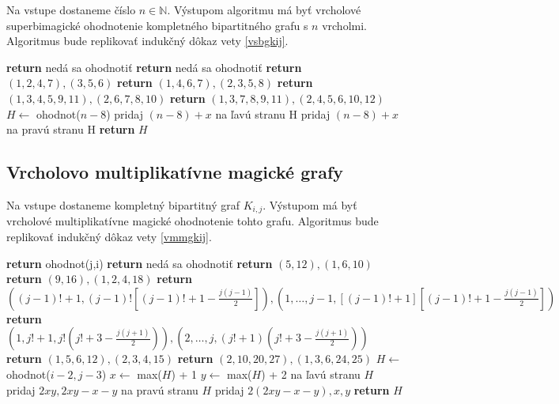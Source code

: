 \begin{alg}
\label{algvsbgkij}
Na vstupe dostaneme číslo $n \in \mathbb{N}$. Výstupom algoritmu má byť vrcholové superbimagické ohodnotenie kompletného bipartitného grafu s $n$ vrcholmi. Algoritmus bude replikovať indukčný dôkaz vety \ref{vsbgkij}.
\end{alg}

\begin{algorithmic}
	\STATE \textbf{return} nedá sa ohodnotiť
\ENDIF
{}
	\STATE \textbf{return} nedá sa ohodnotiť
\ENDIF
{}
	\STATE \textbf{return} $(1, 2, 4, 7), (3, 5, 6)$
\ENDIF
{}
	\STATE \textbf{return} $(1, 4, 6, 7), (2, 3, 5, 8)$
\ENDIF
{}
	\STATE \textbf{return} $(1, 3, 4, 5, 9, 11), (2, 6, 7, 8, 10)$
\ENDIF
{}
	\STATE \textbf{return} $(1, 3, 7, 8, 9, 11), (2, 4, 5, 6, 10, 12)$
\ENDIF
\STATE $H \gets$ ohodnot($n - 8$)
		\STATE pridaj $(n-8)+x$ na ľavú stranu H
	\ELSE
		\STATE pridaj $(n-8)+x$ na pravú stranu H
	\ENDIF
\ENDFOR
\STATE \textbf{return} $H$
\end{algorithmic}

\subsection{Vrcholovo multiplikatívne magické grafy}

\begin{alg}
\label{algvmmgkij}
Na vstupe dostaneme kompletný bipartitný graf $K_{i,j}$. Výstupom má byť vrcholové multiplikatívne magické ohodnotenie tohto grafu. Algoritmus bude replikovať indukčný dôkaz vety \ref{vmmgkij}.
\end{alg}

\begin{algorithmic}
	\STATE \textbf{return} ohodnot(j,i)
\ENDIF
{}
	\STATE \textbf{return} nedá sa ohodnotiť
\ENDIF
{}
	\STATE \textbf{return} $(5, 12), (1, 6, 10)$
\ENDIF
{}
	\STATE \textbf{return} $(9, 16), (1, 2, 4, 18)$
\ENDIF
{}
	\STATE \textbf{return} $((j-1)! + 1, (j-1)! [(j-1)! + 1 - \frac{j(j-1)}{2}] ), (1, \dots , j-1, [(j-1)! + 1] [(j-1)! + 1 - \frac{j(j-1)}{2}] )$
\ENDIF
{}
	\STATE \textbf{return} $(1, j! + 1, j! (j! + 3 - \frac{j(j+1)}{2}) ), (2, \dots , j, (j! + 1) (j! + 3 - \frac{j(j+1)}{2}))$
\ENDIF
{}
	\STATE \textbf{return} $(1, 5, 6, 12), (2, 3, 4, 15)$
\ENDIF
{}
	\STATE \textbf{return} $(2, 10, 20, 27), (1, 3, 6, 24, 25)$
\ENDIF
\STATE $H \gets$ ohodnot($i - 2, j - 3$)
\STATE $x \gets$ max($H$) + 1
\STATE $y \gets$ max($H$) + 2
\STATE na ľavú stranu $H$ pridaj $2xy, 2xy - x - y$
\STATE na pravú stranu $H$ pridaj $2(2xy - x - y), x, y$
\STATE \textbf{return} $H$
\end{algorithmic}

